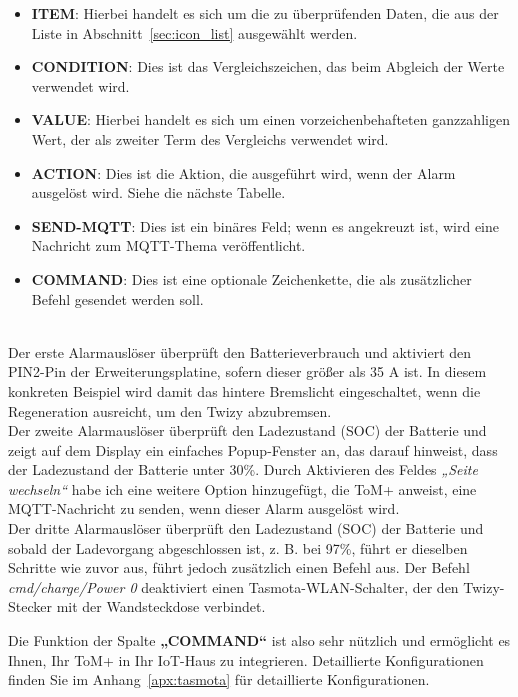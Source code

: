 \begin{itemize}
    \item \textbf{ITEM}: Hierbei handelt es sich um die zu überprüfenden Daten, die aus der Liste in Abschnitt~\ref{sec:icon_list} ausgewählt werden.
    \item \textbf{CONDITION}: Dies ist das Vergleichszeichen, das beim Abgleich der Werte verwendet wird.
    \item \textbf{VALUE}: Hierbei handelt es sich um einen vorzeichenbehafteten ganzzahligen Wert, der als zweiter Term des Vergleichs verwendet wird.
    \item \textbf{ACTION}: Dies ist die Aktion, die ausgeführt wird, wenn der Alarm ausgelöst wird. Siehe die nächste Tabelle.
    \item \textbf{SEND-MQTT}: Dies ist ein binäres Feld; wenn es angekreuzt ist, wird eine Nachricht zum MQTT-Thema veröffentlicht.
    \item \textbf{COMMAND}: Dies ist eine optionale Zeichenkette, die als zusätzlicher Befehl gesendet werden soll.
\end{itemize}
\  \\
Der erste Alarmauslöser überprüft den Batterieverbrauch und aktiviert den PIN2-Pin der 
Erweiterungsplatine, sofern dieser größer als 35 A ist. In diesem konkreten Beispiel wird damit
das hintere Bremslicht eingeschaltet, wenn die Regeneration ausreicht, um den Twizy abzubremsen.\\

Der zweite Alarmauslöser überprüft den Ladezustand (SOC) der Batterie und zeigt auf dem Display ein einfaches Popup-Fenster an,
das darauf hinweist, dass der Ladezustand der Batterie unter 30\%. Durch Aktivieren des Feldes \textit{„Seite wechseln“}
habe ich eine weitere Option hinzugefügt, die ToM+ anweist, eine MQTT-Nachricht zu senden, wenn dieser Alarm ausgelöst wird.\\

Der dritte Alarmauslöser überprüft den Ladezustand (SOC) der Batterie und sobald der Ladevorgang abgeschlossen ist,
z. B. bei 97\%, führt er dieselben Schritte wie zuvor aus, führt jedoch zusätzlich einen Befehl aus. Der
Befehl \textit{cmd/charge/Power 0} deaktiviert einen Tasmota-WLAN-Schalter, der den
Twizy-Stecker mit der Wandsteckdose verbindet.

Die Funktion der Spalte \textbf{„COMMAND“} ist also sehr nützlich und ermöglicht es Ihnen, 
Ihr ToM+ in Ihr IoT-Haus zu integrieren. Detaillierte Konfigurationen finden Sie im Anhang~\ref{apx:tasmota} für detaillierte Konfigurationen.\\

